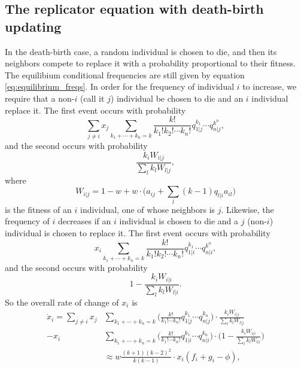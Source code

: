 \documentclass[14pt, a4paper, justified]{article}
\begin{document}
\subsection{The replicator equation with death-birth updating}

In the death-birth case, a random individual is chosen to die, and then its neighbors compete to replace it with a probability proportional to their fitness.
The equilibium conditional frequencies are still given by equation \ref{eq:equilibrium_freqs}.
In order for the frequency of individual $i$ to increase, we require that a non-$i$ (call it $j$) individual be chosen to die and an $i$ individual replace it.
The first event occurs with probability
\begin{equation}
    \sum_{j \neq i} x_j \sum_{k_1 + \cdots + k_n = k}\frac{k!}{k_1! k_2! \cdots k_n!} q_{1|j}^{k_1} \cdots q_{n|j}^{k^n},
\end{equation}
and the second occurs with probability
\begin{equation}
    \frac{k_i W_{i|j}}{\sum_l k_l W_{l|j}},
\end{equation}
where
\begin{equation}
    W_{i|j} = 1 - w + w \cdot \Big( a_{ij} + \sum_l (k-1) q_{l|i} a_{il} \Big)
\end{equation}
is the fitness of an $i$ individual, one of whose neighbors is $j$.
Likewise, the frequency of $i$ decreases if an $i$ individual is chosen to die and a $j$ (non-$i$) individual is chosen to replace it.
The first event occurs with probability
\begin{equation}
    x_i \sum_{k_1 + \cdots + k_n = k}\frac{k!}{k_1! k_2! \cdots k_n!} q_{1|i}^{k_1} \cdots q_{n|i}^{k^n},
\end{equation}
and the second occurs with probability
\begin{equation}
    1 - \frac{k_i W_{i|i}}{\sum_l k_l W_{l|i}}.
\end{equation}
So the overall rate of change of $x_i$ is
\begin{equation}
    \begin{split}
        \dot{x}_i = \sum_{j \neq i} x_j & \sum_{k_1 + \cdots + k_n = k} \Big( \frac{k!}{k_1! \cdots k_n!} q_{1|j}^{k_1} \cdots q_{n|j}^{k_n} \Big) \cdot \frac{k_i W_{i|j}}{\sum_l k_l W_{l|j}}
        \\
        - x_i & \sum_{k_1 + \cdots + k_n = k} \Big( \frac{k!}{k_1! \cdots k_n!} q_{1|i}^{k_1} \cdots q_{n|i}^{k_n} \Big) \cdot \Big( 1- \frac{k_i W_{i|i}}{\sum_l k_l W_{l|i}} \Big)
        \\
        & \approx w \frac{(k+1)(k-2)^2}{k (k-1)} \cdot x_i (f_i + g_i - \phi),
    \end{split}
    \label{eq:db_replicator}
\end{equation}
\end{document}
